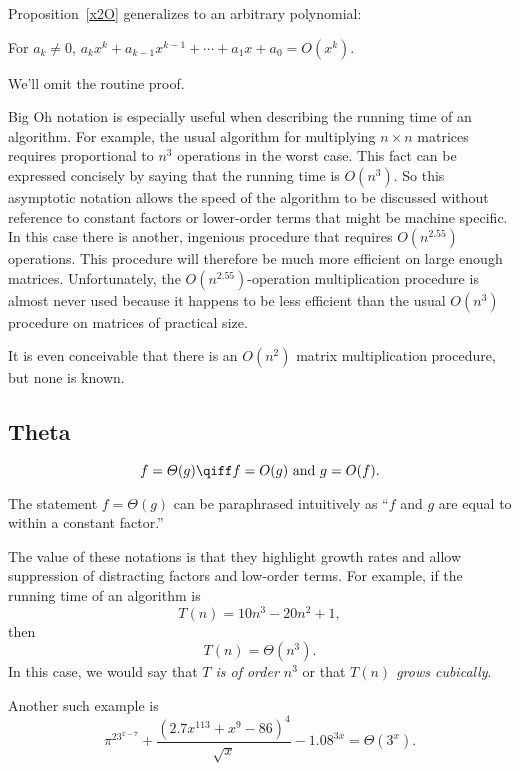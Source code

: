 Proposition~\ref{x2O} generalizes to an arbitrary polynomial:
\begin{proposition}
For $a_k\neq 0$, $a_k x^k + a_{k-1} x^{k-1} + \cdots + a_1x + a_0 = O(x^k)$.
\end{proposition}
We'll omit the routine proof.

Big Oh notation is especially useful when describing the running time of
an algorithm.  For example, the usual algorithm for multiplying $n \times
n$ matrices requires proportional to $n^3$ operations in the worst case.
This fact can be expressed concisely by saying that the running time is
$O(n^3)$.  So this asymptotic notation allows the speed of the algorithm
to be discussed without reference to constant factors or lower-order terms
that might be machine specific.  In this case there is another, ingenious
 procedure that requires $O(n^{2.55})$
operations.  This procedure will therefore be much more efficient on large
enough matrices.  Unfortunately, the $O(n^{2.55})$-operation
multiplication procedure is almost never used because it happens to be
less efficient than the usual $O(n^3)$ procedure on matrices of practical
size. 
\begin{editingnotes}
It is even conceivable that there is an $O(n^2)$ matrix
multiplication procedure, but none is known.
\end{editingnotes}

\subsection{\index{$\Theta()$}Theta}

\begin{definition}
\[
f = \varTheta(g)
\qiff
f=O(g) \text{ and } g=O(f).
\]
\end{definition}

The statement $f = \varTheta(g)$ can be paraphrased intuitively as ``$f$
and $g$ are equal to within a constant factor.''

The value of these notations is that they highlight growth rates and allow
suppression of distracting factors and low-order terms.  For example, if
the running time of an algorithm is
\[
T(n) = 10n^3 - 20n^2 + 1,
\]
then
\[
T(n) = \varTheta(n^3).
\]
In this case, we would say that \emph{$T$ is of order $n^3$} or that
\emph{$T(n)$ grows cubically}.

Another such example is
\[
{{\pi^23^{x-7} + \frac{(2.7x^{113} + x^9- 86)^4}{\sqrt{x}} - 1.08^{3x}}} =
\varTheta(3^x).
\]

